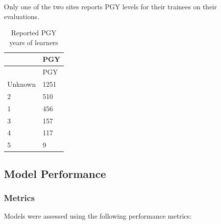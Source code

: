 \documentclass[
  letterpaper,
  DIV=11,
  numbers=noendperiod]{scrartcl}
\begin{document}
Only one of the two sites reports PGY levels for their trainees on their
evaluations.

\hypertarget{tbl-pgy}{}
\begin{longtable}[]{@{}ll@{}}
\caption{\label{tbl-pgy}Reported PGY years of learners}\tabularnewline
\toprule()
& PGY \\
\midrule()
\endfirsthead
\toprule()
& PGY \\
\midrule()
\endhead
Unknown & 1251 \\
2 & 510 \\
1 & 456 \\
3 & 157 \\
4 & 117 \\
5 & 9 \\
\bottomrule()
\end{longtable}

\hypertarget{model-performance}{%
\subsection{Model Performance}\label{model-performance}}

\hypertarget{metrics}{%
\subsubsection{Metrics}\label{metrics}}

Models were assessed using the following performance metrics:
\end{document}
